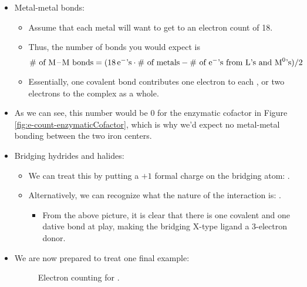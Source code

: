 \documentclass[../notes.tex]{subfiles}
\begin{document}
\begin{itemize}
    \item Metal-metal bonds:
    \begin{itemize}
        \item Assume that each metal will want to get to an electron count of 18.
        \item Thus, the number of  bonds you would expect is
        \begin{equation*}
            \text{\# of \ce{M-M} bonds} = (18\,\e[-]\text{'s}\cdot\text{\# of metals}-\text{\# of }\e[-]\text{'s from L's and \ce{M^0}'s})/2
        \end{equation*}
        \item Essentially, one  covalent bond contributes one electron to each , or two electrons to the complex as a whole.
    \end{itemize}
    \item As we can see, this number would be 0 for the enzymatic cofactor in Figure \ref{fig:e-count-enzymaticCofactor}, which is why we'd expect no metal-metal bonding between the two iron centers.
    \item Bridging hydrides and halides:
    \begin{itemize}
        \item We can treat this by putting a $+1$ formal charge on the bridging atom: .
        \item Alternatively, we can recognize what the nature of the interaction is: .
        \begin{itemize}
            \item From the above picture, it is clear that there is one covalent and one dative bond at play, making the bridging X-type ligand a 3-electron donor.
        \end{itemize}
    \end{itemize}
    \item We are now prepared to treat one final example:
    \vspace{1em}
    \begin{figure}[h!]
        \centering
        \caption{Electron counting for .}

\end{figure}
\end{itemize}
\end{document}
